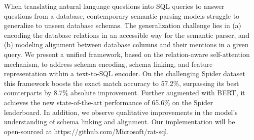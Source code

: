 When translating natural language questions into SQL queries to answer questions from a database, contemporary semantic parsing models struggle to generalize to unseen database schemas. The generalization challenge lies in (a) encoding the database relations in an accessible way for the semantic parser, and (b) modeling alignment between database columns and their mentions in a given query. We present a unified framework, based on the relation-aware self-attention mechanism, to address schema encoding, schema linking, and feature representation within a text-to-SQL encoder. On the challenging Spider dataset this framework boosts the exact match accuracy to 57.2\%, surpassing its best counterparts by 8.7\% absolute improvement. Further augmented with BERT, it achieves the new state-of-the-art performance of 65.6\% on the Spider leaderboard. In addition, we observe qualitative improvements in the model's understanding of schema linking and alignment. Our implementation will be open-sourced at https://github.com/Microsoft/rat-sql.
